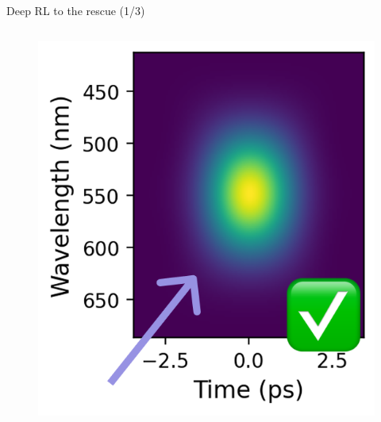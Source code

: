 \documentclass{beamer}
\begin{document}
\begin{frame}{Deep RL to the rescue (1/3)}
\begin{columns}[T,totalwidth=\textwidth]
\begin{column}{0.3\textwidth}
\begin{figure}
        \end{figure}
        \begin{figure}
            \includegraphics[width=0.6\linewidth]{images/rl-sol-1.png}
        \end{figure}
    \end{column}
\end{columns}
\end{frame}
\end{document}
